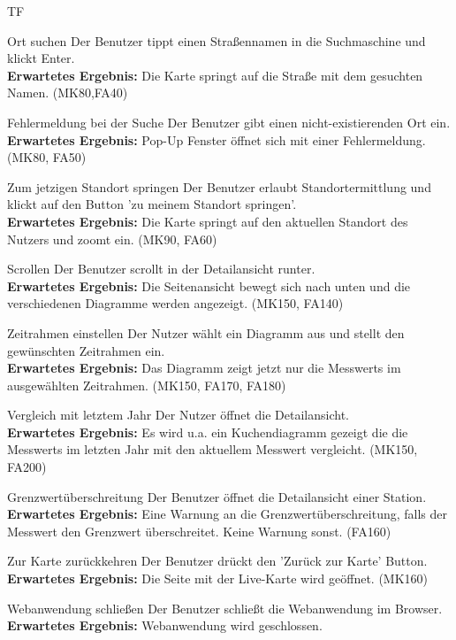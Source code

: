 \begin{Kriterien}{TF}
	\item[Ort suchen] Der Benutzer tippt einen Straßennamen in die Suchmaschine und klickt Enter. \\ \textbf{Erwartetes Ergebnis:} Die Karte springt auf die Straße mit dem gesuchten Namen. (MK80,FA40)
	
	\item[Fehlermeldung bei der Suche] Der Benutzer gibt einen nicht-existierenden Ort ein. \\ \textbf{Erwartetes Ergebnis:} Pop-Up Fenster öffnet sich mit einer Fehlermeldung. (MK80, FA50)
	
	\item[Zum jetzigen Standort springen] Der Benutzer erlaubt Standortermittlung und klickt auf den Button  'zu meinem Standort springen'. \\ \textbf{Erwartetes Ergebnis:} Die Karte springt auf den aktuellen Standort des Nutzers und zoomt ein. (MK90, FA60)
	
	\item[Scrollen] Der Benutzer scrollt in der Detailansicht runter. \\ \textbf{Erwartetes Ergebnis:} Die Seitenansicht bewegt sich nach unten und die verschiedenen Diagramme werden angezeigt. (MK150, FA140)
	
    
    \item[Zeitrahmen einstellen] Der Nutzer wählt ein Diagramm aus und stellt den gewünschten Zeitrahmen ein. \\ \textbf{Erwartetes Ergebnis:} Das Diagramm zeigt jetzt nur die \glspl{Messwert} im ausgewählten Zeitrahmen. (MK150, FA170, FA180)
    
    \item[Vergleich mit letztem Jahr] Der Nutzer öffnet die \gls{Detailansicht}. \\ \textbf{Erwartetes Ergebnis:} Es wird u.a. ein Kuchendiagramm gezeigt die die \glspl{Messwert} im letzten Jahr mit den aktuellem Messwert vergleicht. (MK150, FA200)
    
    \item[Grenzwertüberschreitung] Der Benutzer öffnet die \gls{Detailansicht} einer \gls{Station}. \\ \textbf{Erwartetes Ergebnis:} Eine Warnung an die Grenzwertüberschreitung, falls der \gls{Messwert} den Grenzwert überschreitet. Keine Warnung sonst. (FA160)
	
	\item[Zur Karte zurückkehren] Der Benutzer drückt den 'Zurück zur Karte' Button. \\ \textbf{Erwartetes Ergebnis:} Die Seite mit der \gls{Live-Karte} wird geöffnet. (MK160)
	
	\item[Webanwendung schließen] Der Benutzer schließt die Webanwendung im Browser. \\ \textbf{Erwartetes Ergebnis:} Webanwendung wird geschlossen.
\end{Kriterien}
